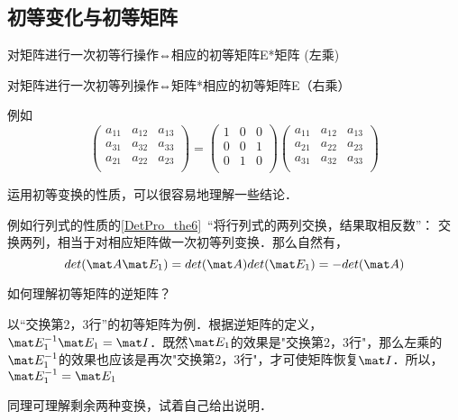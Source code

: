 \subsection{初等变化与初等矩阵}
\begin{theorem}{}
对矩阵进行一次初等行操作⇔相应的初等矩阵E*矩阵 (左乘)

对矩阵进行一次初等列操作⇔矩阵*相应的初等矩阵E（右乘）
\end{theorem}

\begin{example}{}
例如
\begin{equation}
\begin{pmatrix}
    a_{11} & a_{12} & a_{13}\\
    a_{31} & a_{32} & a_{33}\\
    a_{21} & a_{22} & a_{23}\\
\end{pmatrix}
=
    \begin{pmatrix}
        1 & 0 & 0\\
        0 & 0 & 1\\
        0 & 1 & 0\\
    \end{pmatrix}
\begin{pmatrix}
        a_{11} & a_{12} & a_{13}\\
        a_{21} & a_{22} & a_{23}\\
        a_{31} & a_{32} & a_{33}\\
\end{pmatrix}
\end{equation}
\end{example}

运用初等变换的性质，可以很容易地理解一些结论．

\begin{example}{}
例如行列式的性质的\autoref{DetPro_the6}~“将行列式的两列交换，结果取相反数”： 交换两列，相当于对相应矩阵做一次初等列变换．那么自然有，
$$det (\mat A \mat E_1)=det (\mat A) det(\mat E_1)=-det (\mat A)$$
\end{example}

\begin{example}{}
如何理解初等矩阵的逆矩阵？

以“交换第2，3行”的初等矩阵为例．根据逆矩阵的定义，$\mat E_1^{-1} \mat E_1 = \mat I$．既然$\mat E_1$的效果是"交换第2，3行"，那么左乘的$\mat E_1^{-1}$的效果也应该是再次"交换第2，3行"，才可使矩阵恢复$\mat I$．所以，$\mat E_1^{-1} =  \mat E_1$

同理可理解剩余两种变换，试着自己给出说明．
\end{example}


